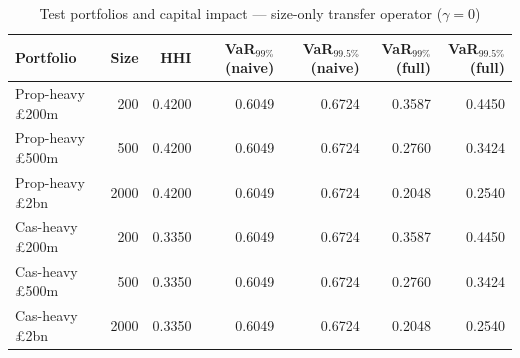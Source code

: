 \begin{table}[htbp]
\centering
\caption{Test portfolios and capital impact --- size-only transfer operator ($\gamma=0$)}
\label{tab:test_portfolios}
\begin{tabular}{lrrrrrr}
\toprule
\textbf{Portfolio} & \textbf{Size} & \textbf{HHI} & \textbf{VaR$_{99\%}$ (naive)} & \textbf{VaR$_{99.5\%}$ (naive)} & \textbf{VaR$_{99\%}$ (full)} & \textbf{VaR$_{99.5\%}$ (full)} \\
\midrule
Prop-heavy £200m & 200 & 0.4200 & 0.6049 & 0.6724 & 0.3587 & 0.4450 \\
Prop-heavy £500m & 500 & 0.4200 & 0.6049 & 0.6724 & 0.2760 & 0.3424 \\
Prop-heavy £2bn & 2000 & 0.4200 & 0.6049 & 0.6724 & 0.2048 & 0.2540 \\
Cas-heavy £200m & 200 & 0.3350 & 0.6049 & 0.6724 & 0.3587 & 0.4450 \\
Cas-heavy £500m & 500 & 0.3350 & 0.6049 & 0.6724 & 0.2760 & 0.3424 \\
Cas-heavy £2bn & 2000 & 0.3350 & 0.6049 & 0.6724 & 0.2048 & 0.2540 \\
\bottomrule
\end{tabular}
\end{table}
